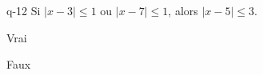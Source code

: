 \begin{truefalse}{q-12}
Si $|x-3|\leq 1$ ou $|x-7|\leq 1$, alors $|x-5|\leq 3$.
\item* Vrai
\item Faux
\end{truefalse}

